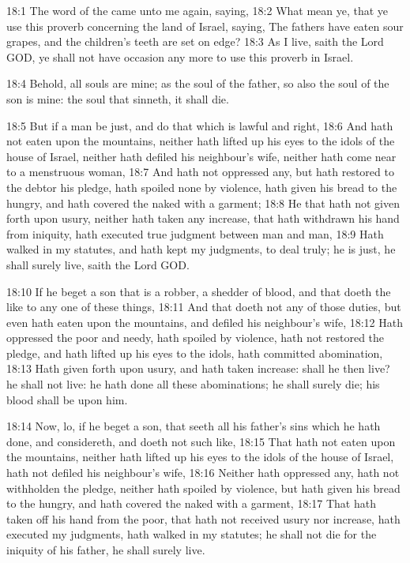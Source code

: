 18:1 The word of the \LORD came unto me again, saying, 18:2 What mean
ye, that ye use this proverb concerning the land of Israel, saying,
The fathers have eaten sour grapes, and the children's teeth are set
on edge?  18:3 As I live, saith the Lord GOD, ye shall not have
occasion any more to use this proverb in Israel.

18:4 Behold, all souls are mine; as the soul of the father, so also
the soul of the son is mine: the soul that sinneth, it shall die.

18:5 But if a man be just, and do that which is lawful and right, 18:6
And hath not eaten upon the mountains, neither hath lifted up his eyes
to the idols of the house of Israel, neither hath defiled his
neighbour's wife, neither hath come near to a menstruous woman, 18:7
And hath not oppressed any, but hath restored to the debtor his
pledge, hath spoiled none by violence, hath given his bread to the
hungry, and hath covered the naked with a garment; 18:8 He that hath
not given forth upon usury, neither hath taken any increase, that hath
withdrawn his hand from iniquity, hath executed true judgment between
man and man, 18:9 Hath walked in my statutes, and hath kept my
judgments, to deal truly; he is just, he shall surely live, saith the
Lord GOD.

18:10 If he beget a son that is a robber, a shedder of blood, and that
doeth the like to any one of these things, 18:11 And that doeth not
any of those duties, but even hath eaten upon the mountains, and
defiled his neighbour's wife, 18:12 Hath oppressed the poor and needy,
hath spoiled by violence, hath not restored the pledge, and hath
lifted up his eyes to the idols, hath committed abomination, 18:13
Hath given forth upon usury, and hath taken increase: shall he then
live? he shall not live: he hath done all these abominations; he shall
surely die; his blood shall be upon him.

18:14 Now, lo, if he beget a son, that seeth all his father's sins
which he hath done, and considereth, and doeth not such like, 18:15
That hath not eaten upon the mountains, neither hath lifted up his
eyes to the idols of the house of Israel, hath not defiled his
neighbour's wife, 18:16 Neither hath oppressed any, hath not
withholden the pledge, neither hath spoiled by violence, but hath
given his bread to the hungry, and hath covered the naked with a
garment, 18:17 That hath taken off his hand from the poor, that hath
not received usury nor increase, hath executed my judgments, hath
walked in my statutes; he shall not die for the iniquity of his
father, he shall surely live.

